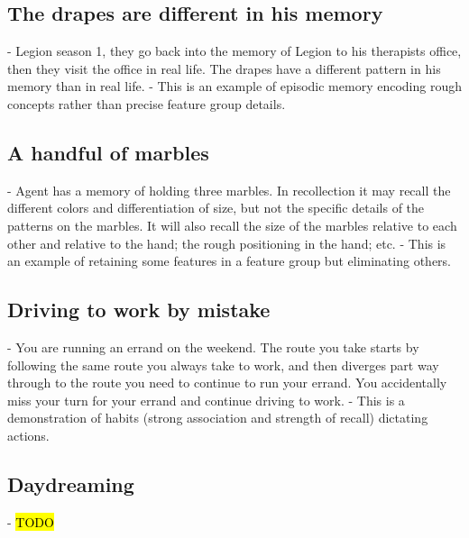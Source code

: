 \documentclass{article}
\begin{document}
\subsection{The drapes are different in his memory}
- Legion season 1, they go back into the memory of Legion to his therapists office, then they visit the office in real life. The drapes have a different pattern in his memory than in real life.
- This is an example of episodic memory encoding rough concepts rather than precise feature group details.

\subsection{A handful of marbles}
- Agent has a memory of holding three marbles. In recollection it may recall the different colors and differentiation of size, but not the specific details of the patterns on the marbles. It will also recall the size of the marbles relative to each other and relative to the hand; the rough positioning in the hand; etc.
- This is an example of retaining some features in a feature group but eliminating others.

\subsection{Driving to work by mistake}
- You are running an errand on the weekend. The route you take starts by following the same route you always take to work, and then diverges part way through to the route you need to continue to run your errand. You accidentally miss your turn for your errand and continue driving to work.
- This is a demonstration of habits (strong association and strength of recall) dictating actions.

\subsection{Daydreaming}
- \hl{TODO}
\end{document}

